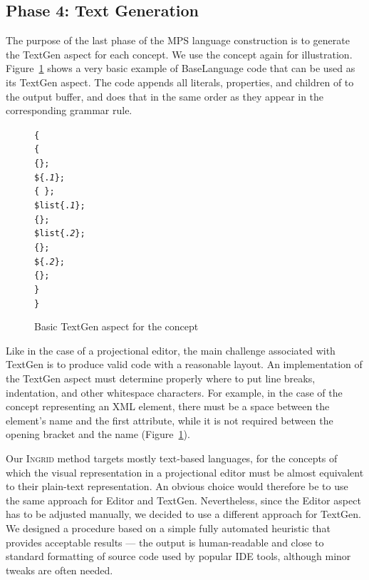 \subsection{Phase 4: Text Generation}
\label{sect:TEXTGENDEF}

The purpose of the last phase of the MPS language construction is to generate the TextGen aspect for each concept.
We use the  concept again for illustration.
Figure~\ref{fig:TEXTGENBASIC} shows a very basic example of BaseLanguage code that can be used as its TextGen aspect.
The code appends all literals, properties, and children of  to the output buffer, and does that in the same order as they appear in the corresponding grammar rule.

\begin{figure}[ht]
\begin{alltt}
\small
{}  \{
   \{
     \{\mpstgliteral{<}\};
     \$\{.\textit{1}\};
     \{\ \};
     \$list\{.\textit{1}\};
     \{\mpstgliteral{>}\};
     \$list\{.\textit{2}\};
     \{\mpstgliteral{</}\};
     \$\{.\textit{2}\};
     \{\mpstgliteral{>}\};
  \}
\}
\end{alltt}
\caption{Basic TextGen aspect for the  concept}
\label{fig:TEXTGENBASIC}
\end{figure}

Like in the case of a projectional editor, the main challenge associated with TextGen is to produce valid code with a reasonable layout.
An implementation of the TextGen aspect must determine properly where to put line breaks, indentation, and other whitespace characters.
For example, in the case of the concept representing an XML element, there must be a space between the element's name and the first attribute, while it is not required between the opening bracket \antlrliteral{\textless} and the name (Figure~\ref{fig:TEXTGENBASIC}).

Our \textsc{Ingrid} method targets mostly text-based languages, for the concepts of which the visual representation in a projectional editor must be almost equivalent to their plain-text representation.
An obvious choice would therefore be to use the same approach for Editor and TextGen.
Nevertheless, since the Editor aspect has to be adjusted manually, we decided to use a different approach for TextGen.
We designed a procedure based on a simple fully automated heuristic that provides acceptable results --- the output is human-readable and close to standard formatting of source code used by popular IDE tools, although minor tweaks are often needed.


